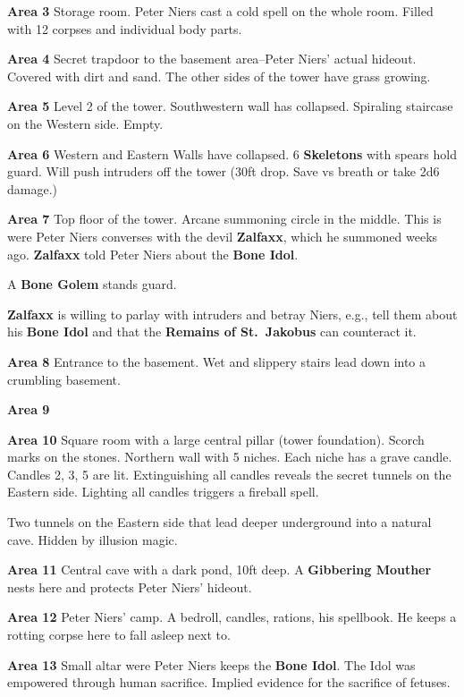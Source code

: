 \documentclass[
]{book}
\begin{document}
\textbf{Area 3}
Storage room. Peter Niers cast a cold spell on the whole room. Filled with 12 corpses and individual body parts.

\textbf{Area 4}
Secret trapdoor to the basement area--Peter Niers' actual hideout. Covered with dirt and sand. The other sides of the tower have grass growing.

\textbf{Area 5}
Level 2 of the tower. Southwestern wall has collapsed. Spiraling staircase on the Western side. Empty.

\textbf{Area 6}
Western and Eastern Walls have collapsed. 6 \textbf{Skeletons} with spears hold guard. Will push intruders off the tower (30ft drop. Save vs breath or take 2d6 damage.)

\textbf{Area 7}
Top floor of the tower. Arcane summoning circle in the middle. This is were Peter Niers converses with the devil \textbf{Zalfaxx}, which he summoned weeks ago. \textbf{Zalfaxx} told Peter Niers about the \textbf{Bone Idol}.

A \textbf{Bone Golem} stands guard.

\textbf{Zalfaxx} is willing to parlay with intruders and betray Niers, e.g., tell them about his \textbf{Bone Idol} and that the \textbf{Remains of St.~Jakobus} can counteract it.

\textbf{Area 8}
Entrance to the basement. Wet and slippery stairs lead down into a crumbling basement.

\textbf{Area 9}

\textbf{Area 10}
Square room with a large central pillar (tower foundation). Scorch marks on the stones. Northern wall with 5 niches. Each niche has a grave candle. Candles 2, 3, 5 are lit. Extinguishing all candles reveals the secret tunnels on the Eastern side. Lighting all candles triggers a fireball spell.

Two tunnels on the Eastern side that lead deeper underground into a natural cave. Hidden by illusion magic.

\textbf{Area 11}
Central cave with a dark pond, 10ft deep. A \textbf{Gibbering Mouther} nests here and protects Peter Niers' hideout.

\textbf{Area 12}
Peter Niers' camp. A bedroll, candles, rations, his spellbook. He keeps a rotting corpse here to fall asleep next to.

\textbf{Area 13}
Small altar were Peter Niers keeps the \textbf{Bone Idol}. The Idol was empowered through human sacrifice. Implied evidence for the sacrifice of fetuses.
\end{document}
